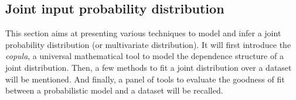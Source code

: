 \subsection{Joint input probability distribution}

This section aims at presenting various techniques to model and infer a joint probability distribution (or multivariate distribution).
It will first introduce the \textit{copula}, a universal mathematical tool to model the dependence structure of a joint distribution. 
Then, a few methods to fit a joint distribution over a dataset will be mentioned. 
And finally, a panel of tools to evaluate the goodness of fit between a probabilistic model and a dataset will be recalled. 


